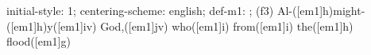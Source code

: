 initial-style: 1;
centering-scheme: english;
def-m1: \grealign;
(f3) Al-([em1]h)might-([em1]h)y([em1]iv) God,([em1]jv) who([em1]i) from([em1]i) the([em1]h) flood([em1]g)